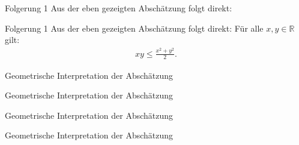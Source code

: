 \documentclass[10pt]{beamer}
\def\bR{\mathbb{R}}
\begin{document}
\begin{frame}{Folgerung 1}
    Aus der eben gezeigten Abschätzung folgt direkt: 
\end{frame}



\begin{frame}{Folgerung 1}
    Aus der eben gezeigten Abschätzung folgt direkt: Für alle \( x, y \in \bR \) gilt:
    \begin{align*}
        xy
        \leq \frac{x^{2} + y^{2}}{2}.
    \end{align*}
\end{frame}



\begin{frame}{Geometrische Interpretation der Abschätzung}
    
\end{frame}



\begin{frame}{Geometrische Interpretation der Abschätzung}
    \begin{center}
    \end{center}
\end{frame}



\begin{frame}{Geometrische Interpretation der Abschätzung}
    \begin{center}
    \end{center}
\end{frame}



\begin{frame}{Geometrische Interpretation der Abschätzung}
    \begin{center}
    \end{center}
\end{frame}
\end{document}
